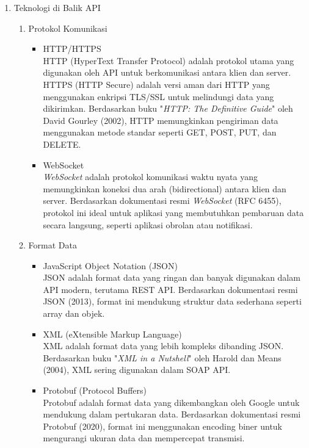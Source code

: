 \begin{enumerate}[label*=\arabic*.,ref=\arabic*]
    \item Teknologi di Balik API
    \begin{enumerate}[label=\alph*.]
        \item Protokol Komunikasi
        \begin{itemize}
            \item HTTP/HTTPS \\
            HTTP (HyperText Transfer Protocol) adalah protokol utama yang digunakan oleh API untuk berkomunikasi antara klien dan server. HTTPS (HTTP Secure) adalah versi aman dari HTTP yang menggunakan enkripsi TLS/SSL untuk melindungi data yang dikirimkan. Berdasarkan buku "\textit{HTTP: The Definitive Guide}" oleh David Gourley (2002), HTTP memungkinkan pengiriman data menggunakan metode standar seperti GET, POST, PUT, dan DELETE.
            \item WebSocket \\
            \textit{WebSocket} adalah protokol komunikasi waktu nyata yang memungkinkan koneksi dua arah (bidirectional) antara klien dan server. Berdasarkan dokumentasi resmi \textit{WebSocket} (RFC 6455), protokol ini ideal untuk aplikasi yang membutuhkan pembaruan data secara langsung, seperti aplikasi obrolan atau notifikasi.
        \end{itemize}
        \item Format Data 
            \begin{itemize}
                \item JavaScript Object Notation (JSON) \\
                JSON adalah format data yang ringan dan banyak digunakan dalam API modern, terutama REST API. Berdasarkan dokumentasi resmi JSON (2013), format ini mendukung struktur data sederhana seperti array dan objek.
                \item XML (eXtensible Markup Language) \\
                XML adalah format data yang lebih kompleks dibanding JSON. Berdasarkan buku "\textit{XML in a Nutshell}" oleh Harold dan Means (2004), XML sering digunakan dalam SOAP API.
                \item Protobuf (Protocol Buffers) \\
                Protobuf adalah format data yang dikembangkan oleh Google untuk mendukung dalam pertukaran data. Berdasarkan dokumentasi resmi Protobuf (2020), format ini menggunakan encoding biner untuk mengurangi ukuran data dan mempercepat transmisi.
            \end{itemize}

\end{enumerate}
\end{enumerate}
